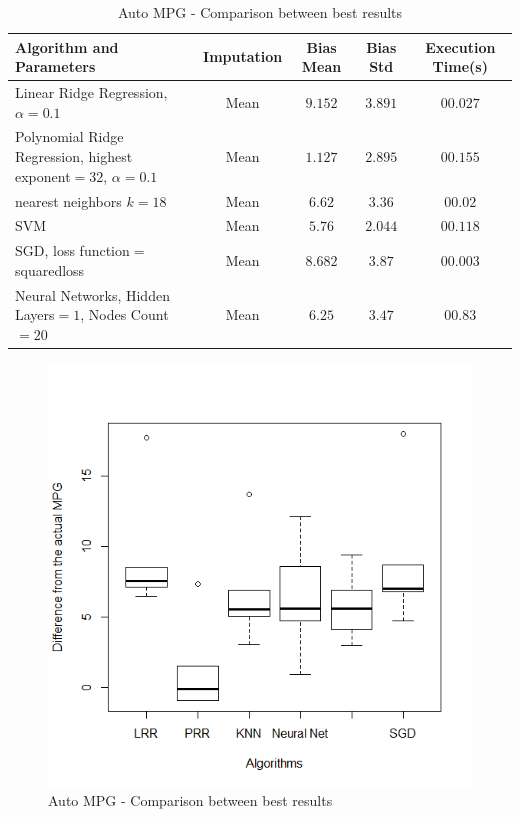 		\begin{table}
\begin{center}
\begin{tabular}{|p{4cm}|c|c|c|c|}
\hline Algorithm and Parameters & Imputation & Bias Mean & Bias Std & Execution Time(s)\\

\hline Linear Ridge Regression, $\alpha=0.1$ & Mean & $9.152$ & $3.891$ & $00.027$ \\

\hline Polynomial Ridge Regression, highest exponent$=32$, $\alpha=0.1$ & Mean & $\mathbf{1.127}$ & $2.895$ & $00.155$  \\

\hline nearest neighbors $k=18$ & Mean & $6.62$ & $3.36$ & $00.02$  \\

\hline SVM & Mean & $5.76$ & $\mathbf{2.044}$ & $00.118$  \\

\hline SGD, loss function$=$squaredloss & Mean & $8.682$ & $3.87$ & $\mathbf{00.003}$  \\

\hline Neural Networks, Hidden Layers$=1$, Nodes Count$=20$ & Mean & $6.25$ & $3.47$ & $00.83$  \\

\hline
\end{tabular}
    \caption{Auto MPG - Comparison between best results}
    \label{table:db1-results}
\end{center}
    \end{table}


\begin{figure}
	\center
	\includegraphics[scale=\figurescaling]{figures/mpg_bestresults.png}
	\caption{Auto MPG - Comparison between best results\label{fig:db1-mpg_bestresults}}
\end{figure}
